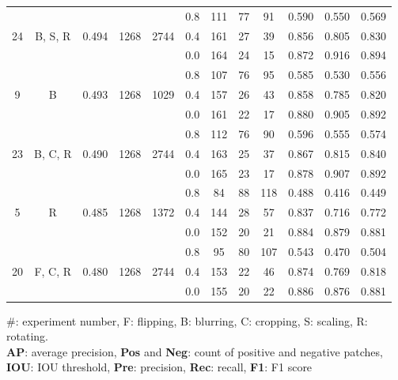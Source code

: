 \documentclass[preprint,12pt,authoryear]{elsarticle}
\begin{document}
\begin{table}
\begin{tabular}{c c c c  c ccc c c c c}
\multirow{3}{*}{24} &  \multirow{3}{*}{B, S, R} & \multirow{3}{*}{0.494 } & \multirow{3}{*}{1268} & \multirow{3}{*}{2744} &0.8 & 111 & 77 & 91 & 0.590  & 0.550  & 0.569 \\
 &  & &  &   & 0.4 & 161 & 27 & 39 & 0.856  & 0.805  & 0.830 \\
 &  & &  &   & 0.0 & 164 & 24 & 15 & 0.872  & 0.916  & 0.894 \\
\midrule
\multirow{3}{*}{9} &  \multirow{3}{*}{B} & \multirow{3}{*}{0.493 } & \multirow{3}{*}{1268} & \multirow{3}{*}{1029} &0.8 & 107 & 76 & 95 & 0.585  & 0.530  & 0.556 \\
 &  & &  &   & 0.4 & 157 & 26 & 43 & 0.858  & 0.785  & 0.820 \\
 &  & &  &   & 0.0 & 161 & 22 & 17 & 0.880  & 0.905  & 0.892 \\
\midrule
\multirow{3}{*}{23} &  \multirow{3}{*}{B, C, R} & \multirow{3}{*}{0.490 } & \multirow{3}{*}{1268} & \multirow{3}{*}{2744} &0.8 & 112 & 76 & 90 & 0.596  & 0.555  & 0.574 \\
 &  & &  &   & 0.4 & 163 & 25 & 37 & 0.867  & 0.815  & 0.840 \\
 &  & &  &   & 0.0 & 165 & 23 & 17 & 0.878  & 0.907  & 0.892 \\
\midrule
\multirow{3}{*}{5} &  \multirow{3}{*}{R} & \multirow{3}{*}{0.485 } & \multirow{3}{*}{1268} & \multirow{3}{*}{1372} &0.8 & 84 & 88 & 118 & 0.488  & 0.416  & 0.449 \\
 &  & &  &   & 0.4 & 144 & 28 & 57 & 0.837  & 0.716  & 0.772 \\
 &  & &  &   & 0.0 & 152 & 20 & 21 & 0.884  & 0.879  & 0.881 \\
\midrule
\multirow{3}{*}{20} &  \multirow{3}{*}{F, C, R} & \multirow{3}{*}{0.480 } & \multirow{3}{*}{1268} & \multirow{3}{*}{2744} &0.8 & 95 & 80 & 107 & 0.543  & 0.470  & 0.504 \\
 &  & &  &   & 0.4 & 153 & 22 & 46 & 0.874  & 0.769  & 0.818 \\
 &  & &  &   & 0.0 & 155 & 20 & 22 & 0.886  & 0.876  & 0.881 \\

\bottomrule
\end{tabular}
\raggedright \#: experiment number, F: flipping, B: blurring, C: cropping, S: scaling, R: rotating.  \\\textbf{AP}: average precision, \textbf{Pos} and \textbf{Neg}: count of positive and negative patches, \textbf{IOU}: IOU threshold, \textbf{Pre}: precision, \textbf{Rec}: recall, \textbf{F1}: F1 score

\end{table}
\end{document}
